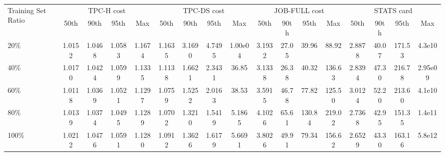 \begin{tabular}{l|cccc|cccc|cccc|cccc}

\toprule

\multirow{2}{*}{Training Set Ratio} & \multicolumn{4}{c|}{TPC-H cost} & \multicolumn{4}{c|}{TPC-DS cost} & \multicolumn{4}{c|}{JOB-FULL cost} & \multicolumn{4}{c|}{STATS card} \\

 & 50th & 90th & 95th & Max & 50th & 90th & 95th & Max & 50th & 90th & 95th & Max & 50th & 90th & 95th & Max \\

\midrule

20\% & \cellcolor{green3}1.0152 & \cellcolor{green2}1.0468 & \cellcolor{green3}1.0583 & \cellcolor{green1}1.1674 & \cellcolor{green1}1.1635 & \cellcolor{green1}3.1690 & \cellcolor{green1}4.7495 & \cellcolor{green1}1.00e04 & \cellcolor{green4}3.1932 & \cellcolor{green4}27.05 & \cellcolor{green5}39.96 & \cellcolor{green5}88.92 & \cellcolor{green2}2.8878 & \cellcolor{green5}40.07 & \cellcolor{green3}171.53 & \cellcolor{green3}4.3e10 \\
40\% & \cellcolor{green2}1.0170 & \cellcolor{green3}1.0424 & \cellcolor{green1}1.0599 & \cellcolor{green2}1.1335 & \cellcolor{green2}1.1138 & \cellcolor{green2}1.6621 & \cellcolor{green2}2.3431 & \cellcolor{green3}36.85 & \cellcolor{green5}3.1338 & \cellcolor{green5}26.38 & \cellcolor{green4}40.32 & \cellcolor{green3}136.63 & \cellcolor{green3}2.8394 & \cellcolor{green2}47.30 & \cellcolor{green1}216.78 & \cellcolor{green5}2.95e09 \\
60\% & \cellcolor{green5}1.0118 & \cellcolor{green5}1.0369 & \cellcolor{green4}1.0521 & \cellcolor{green3}1.1297 & \cellcolor{green4}1.0759 & \cellcolor{green3}1.5252 & \cellcolor{green3}2.0163 & \cellcolor{green2}38.53 & \cellcolor{green3}3.5915 & \cellcolor{green3}46.78 & \cellcolor{green3}77.82 & \cellcolor{green4}125.50 & \cellcolor{green1}3.0124 & \cellcolor{green1}52.20 & \cellcolor{green2}213.60 & \cellcolor{green4}4.1e10 \\
80\% & \cellcolor{green4}1.0139 & \cellcolor{green4}1.0374 & \cellcolor{green5}1.0495 & \cellcolor{green4}1.1289 & \cellcolor{green5}1.0702 & \cellcolor{green5}1.3210 & \cellcolor{green5}1.5419 & \cellcolor{green5}5.1865 & \cellcolor{green1}4.1026 & \cellcolor{green1}65.61 & \cellcolor{green1}130.84 & \cellcolor{green1}219.02 & \cellcolor{green4}2.7368 & \cellcolor{green4}42.95 & \cellcolor{green5}151.35 & \cellcolor{green2}1.4e11 \\
100\% & \cellcolor{green1}1.0212 & \cellcolor{green1}1.0476 & \cellcolor{green2}1.0591 & \cellcolor{green5}1.1280 & \cellcolor{green3}1.0912 & \cellcolor{green4}1.3626 & \cellcolor{green4}1.6179 & \cellcolor{green4}5.6691 & \cellcolor{green2}3.8026 & \cellcolor{green2}49.91 & \cellcolor{green2}79.34 & \cellcolor{green2}156.62 & \cellcolor{green5}2.6529 & \cellcolor{green3}43.30 & \cellcolor{green4}163.16 & \cellcolor{green1}5.8e12 \\

\bottomrule
\end{tabular}